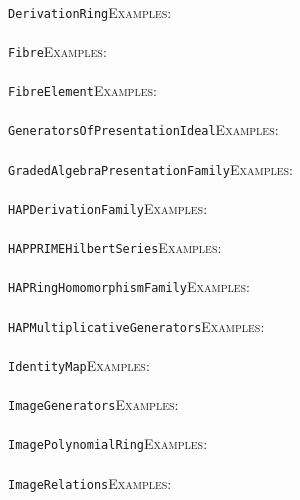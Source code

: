 \documentclass[a4paper,11pt]{report}
\begin{document}
{{ \\
 \texttt{DerivationRing}{\nobreakspace}{\nobreakspace}{\nobreakspace}{\nobreakspace}\textsc{Examples:} \\
 \\
 \texttt{Fibre}{\nobreakspace}{\nobreakspace}{\nobreakspace}{\nobreakspace}\textsc{Examples:} \\
 \\
 \texttt{FibreElement}{\nobreakspace}{\nobreakspace}{\nobreakspace}{\nobreakspace}\textsc{Examples:} \\
 \\
 \texttt{GeneratorsOfPresentationIdeal}{\nobreakspace}{\nobreakspace}{\nobreakspace}{\nobreakspace}\textsc{Examples:} \\
 \\
 \texttt{GradedAlgebraPresentationFamily}{\nobreakspace}{\nobreakspace}{\nobreakspace}{\nobreakspace}\textsc{Examples:} \\
 \\
 \texttt{HAPDerivationFamily}{\nobreakspace}{\nobreakspace}{\nobreakspace}{\nobreakspace}\textsc{Examples:} \\
 \\
 \texttt{HAPPRIME{\textunderscore}HilbertSeries}{\nobreakspace}{\nobreakspace}{\nobreakspace}{\nobreakspace}\textsc{Examples:} \\
 \\
 \texttt{HAPRingHomomorphismFamily}{\nobreakspace}{\nobreakspace}{\nobreakspace}{\nobreakspace}\textsc{Examples:} \\
 \\
 \texttt{HAP{\textunderscore}MultiplicativeGenerators}{\nobreakspace}{\nobreakspace}{\nobreakspace}{\nobreakspace}\textsc{Examples:} \\
 \\
 \texttt{IdentityMap}{\nobreakspace}{\nobreakspace}{\nobreakspace}{\nobreakspace}\textsc{Examples:} \\
 \\
 \texttt{ImageGenerators}{\nobreakspace}{\nobreakspace}{\nobreakspace}{\nobreakspace}\textsc{Examples:} \\
 \\
 \texttt{ImagePolynomialRing}{\nobreakspace}{\nobreakspace}{\nobreakspace}{\nobreakspace}\textsc{Examples:} \\
 \\
 \texttt{ImageRelations}{\nobreakspace}{\nobreakspace}{\nobreakspace}{\nobreakspace}\textsc{Examples:} \\
 \\
}}
\end{document}
